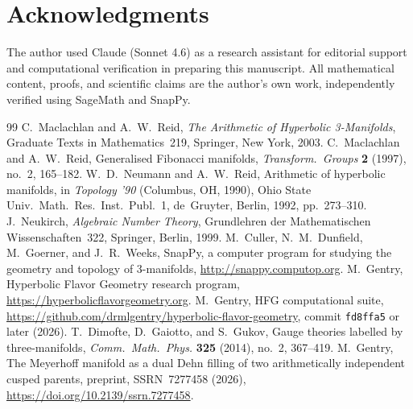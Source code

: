 \documentclass[12pt]{amsart}
\begin{document}
\section*{Acknowledgments}
The author used Claude (Sonnet 4.6) as a research
assistant for editorial support and computational verification in
preparing this manuscript. All mathematical content, proofs, and scientific
claims are the author's own work, independently verified using SageMath
and SnapPy.

\begin{thebibliography}{99}
C.~Maclachlan and A.~W.~Reid,
\emph{The Arithmetic of Hyperbolic 3-Manifolds},
Graduate Texts in Mathematics~219, Springer, New York, 2003.
C.~Maclachlan and A.~W.~Reid,
Generalised Fibonacci manifolds,
\emph{Transform.\ Groups} \textbf{2} (1997), no.~2, 165--182.
W.~D.~Neumann and A.~W.~Reid,
Arithmetic of hyperbolic manifolds,
in \emph{Topology '90} (Columbus, OH, 1990),
Ohio State Univ.\ Math.\ Res.\ Inst.\ Publ.~1,
de~Gruyter, Berlin, 1992, pp.~273--310.
J.~Neukirch,
\emph{Algebraic Number Theory},
Grundlehren der Mathematischen Wissenschaften~322,
Springer, Berlin, 1999.
M.~Culler, N.~M.~Dunfield, M.~Goerner, and J.~R.~Weeks,
SnapPy, a computer program for studying the geometry and topology
of 3-manifolds, \url{http://snappy.computop.org}.
M.~Gentry,
Hyperbolic Flavor Geometry research program,
\url{https://hyperbolicflavorgeometry.org}.
M.~Gentry,
HFG computational suite,\\
\url{https://github.com/drmlgentry/hyperbolic-flavor-geometry},
commit \texttt{fd8ffa5} or later (2026).
T.~Dimofte, D.~Gaiotto, and S.~Gukov,
Gauge theories labelled by three-manifolds,
\emph{Comm.\ Math.\ Phys.} \textbf{325} (2014), no.~2, 367--419.
M.~Gentry,
The Meyerhoff manifold as a dual Dehn filling of two
arithmetically independent cusped parents,
preprint, SSRN~7277458 (2026),\\
\url{https://doi.org/10.2139/ssrn.7277458}.
\end{thebibliography}
\end{document}
